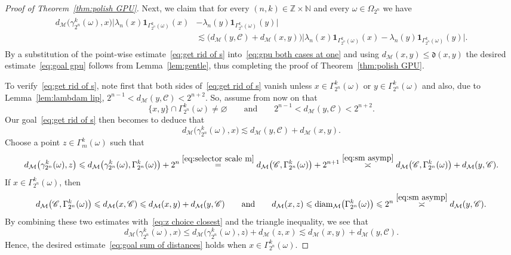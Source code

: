\documentclass[11pt,reqno]{amsart}
\renewcommand{\le}{\leqslant}
\newcommand{\diam}{\mathrm{diam}}
\theoremstyle{remark}
\newcommand{\MM}{\mathcal{M}}
\newcommand{\N}{\mathbb N}
\newcommand{\Z}{\mathbb Z}
\renewcommand{\emptyset}{\varnothing}
\newcommand{\sub}{\mathscr{C}}
\renewcommand{\1}{\mathbf 1}
\begin{document}
\begin{proof}[Proof of Theorem~\ref{thm:polish GPU}]
Next, we claim that for every $(n,k)\in \Z\times \N$ and every $\omega\in \Omega_{2^n}$ we have
\begin{align}\label{eq:get rid of s}
\begin{split}
d_{\MM}\big(\gamma^k_{2^n}(\omega),x\big)\big|\lambda_n(x)\1_{\Gamma_{2^n}^k(\omega)}(x)&-\lambda_n(y)\1_{\Gamma_{2^n}^k(\omega)}(y)\big|\\&\lesssim \big(d_{\MM}(y,\sub)+d_{\MM}(x,y)\big)\big|\lambda_n(x)\1_{\Gamma_{2^n}^k(\omega)}(x)-\lambda_n(y)\1_{\Gamma_{2^n}^k(\omega)}(y)\big|.
\end{split}
\end{align}
By a substitution of the point-wise estimate~\eqref{eq:get rid of s} into~\eqref{eq:gpu both cases at one} and using $d_\MM(x,y)\le \mathfrak{d}(x,y)$ the desired estimate~\eqref{eq:goal gpu} follows from Lemma~\ref{lem:gentle}, thus completing the proof of Theorem~\ref{thm:polish GPU}.








To verify~\eqref{eq:get rid of s}, note first that both sides of~\eqref{eq:get rid of s} vanish unless $x\in \Gamma_{2^n}^k(\omega)$ or $y\in \Gamma_{2^n}^k(\omega)$ and also, due to Lemma~\ref{lem:lambdam lip}, $2^{n-1}< d_{\MM}(y,\sub)< 2^{n+2}$. So, assume from now on that
\begin{equation}\label{eq:sm asymp}
\{x,y\}\cap \Gamma_{2^n}^k(\omega)\neq \emptyset\qquad\mathrm{and}\qquad 2^{n-1}< d_{\MM}(y,\sub)< 2^{n+2}.
\end{equation}
Our goal~\eqref{eq:get rid of s} then becomes  to deduce that
\begin{equation}\label{eq:goal sum of distances}
d_{\MM}\big(\gamma^k_{2^n}(\omega),x\big)\lesssim d_{\MM}(y,\sub)+d_{\MM}(x,y).
\end{equation}
Choose a point $z\in \Gamma_m^k(\omega)$ such that
\begin{equation}\label{eq:z choice closest}
d_{\MM}\big(\gamma_{2^n}^k(\omega),z\big)\le d_{\MM}\big(\gamma_{2^n}^k(\omega),\Gamma_{2^n}^k(\omega)\big)+2^n\stackrel{\eqref{eq:selector scale m}}{=}d_{\MM}\big(\sub,\Gamma_{2^n}^k(\omega)\big)+2^{n+1}\stackrel{\eqref{eq:sm asymp}}{\asymp} d_{\MM}\big(\sub,\Gamma_{2^n}^k(\omega)\big)+d_\MM(y,\sub).
\end{equation}
If $x\in \Gamma_{2^n}^k(\omega)$, then
$$
d_{\MM}\big(\sub,\Gamma_{2^n}^k(\omega)\big)\le d_{\MM}(x,\sub)\le d_{\MM}(x,y)+d_{\MM}(y,\sub)\qquad\mathrm{and}\qquad
d_{\MM}(x,z)\le \diam_{\MM}\big(\Gamma_{2^n}^k(\omega)\big)\le 2^n\stackrel{\eqref{eq:sm asymp}}{\asymp}  d_\MM(y,\sub).
$$
By combining these two estimates with~\eqref{eq:z choice closest} and the triangle inequality, we see that
$$
d_{\MM}\big(\gamma^k_{2^n}(\omega),x\big)\le d_{\MM}\big(\gamma^k_{2^n}(\omega),z\big)+d_{\MM}(z,x)\lesssim d_{\MM}(x,y)+d_{\MM}(y,\sub).
$$
Hence, the desired estimate~\eqref{eq:goal sum of distances} holds when  $x\in \Gamma_{2^n}^k(\omega)$.


\end{proof}
\end{document}

